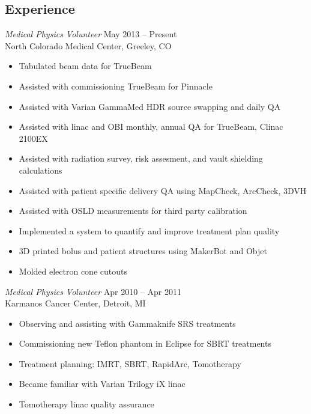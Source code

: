 \documentclass[margin]{res}
\begin{document}
\begin{resume}
\section{Experience} 
{\sl Medical Physics Volunteer} \hfill May 2013 -- Present \\
North Colorado Medical Center, Greeley, CO
 \begin{itemize}  \itemsep -2pt %
    \item Tabulated beam data for TrueBeam
    \item Assisted with commissioning TrueBeam for Pinnacle
    \item Assisted with Varian GammaMed HDR source swapping and daily QA
    \item Assisted with linac and OBI monthly, annual QA for TrueBeam, Clinac 2100EX
    \item Assisted with radiation survey, risk assesment, and vault shielding calculations
    \item Assisted with patient specific delivery QA using MapCheck, ArcCheck, 3DVH
    \item Assisted with OSLD measurements for third party calibration
    \item Implemented a system to quantify and improve treatment plan quality
    \item 3D printed bolus and patient structures using MakerBot and Objet
    \item Molded electron cone cutouts
\end{itemize}

{\sl Medical Physics Volunteer} \hfill Apr 2010 -- Apr 2011 \\
Karmanos Cancer Center, Detroit, MI
 \begin{itemize}  \itemsep -2pt %
    \item Observing and assisting with Gammaknife SRS treatments
    \item Commissioning new Teflon phantom in Eclipse for SBRT treatments
    \item Treatment planning: IMRT, SBRT, RapidArc, Tomotherapy
    \item Became familiar with Varian Trilogy iX linac
    \item Tomotherapy linac quality assurance
\end{itemize}


\end{resume}
\end{document}
